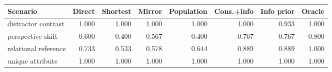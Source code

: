 \begin{tabular}{lrrrrrrr}
\toprule
Scenario & Direct & Shortest & Mirror & Population & Cons.+info & Info prior & Oracle \\
\midrule
distractor contrast & 1.000 & 1.000 & 1.000 & 1.000 & 1.000 & 0.933 & 1.000 \\
perspective shift & 0.600 & 0.400 & 0.567 & 0.400 & 0.767 & 0.767 & 0.800 \\
relational reference & 0.733 & 0.533 & 0.578 & 0.644 & 0.889 & 0.889 & 1.000 \\
unique attribute & 1.000 & 1.000 & 1.000 & 1.000 & 1.000 & 1.000 & 1.000 \\
\bottomrule
\end{tabular}
